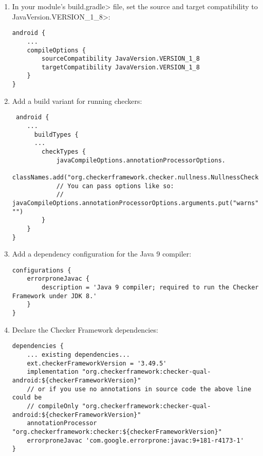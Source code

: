 \begin{enumerate}

\item In your module's \<build.gradle> file, set the source and target
  compatibility to \<JavaVersion.VERSION\_1\_8>:

\begin{Verbatim}
android {
    ...
    compileOptions {
        sourceCompatibility JavaVersion.VERSION_1_8
        targetCompatibility JavaVersion.VERSION_1_8
    }
}
\end{Verbatim}

\item Add a build variant for running checkers:

 \begin{Verbatim}
 android {
    ...
      buildTypes {
      ...
        checkTypes {
            javaCompileOptions.annotationProcessorOptions.
                    classNames.add("org.checkerframework.checker.nullness.NullnessChecker")
            // You can pass options like so:
            // javaCompileOptions.annotationProcessorOptions.arguments.put("warns", "")
        }
    }
}
\end{Verbatim}

\item Add a dependency configuration for the Java 9 compiler:

\begin{mysmall}
\begin{Verbatim}
configurations {
    errorproneJavac {
        description = 'Java 9 compiler; required to run the Checker Framework under JDK 8.'
    }
}

\end{Verbatim}
\end{mysmall}

\item Declare the Checker Framework dependencies:

\begin{mysmall}
\begin{Verbatim}
dependencies {
    ... existing dependencies...
    ext.checkerFrameworkVersion = '3.49.5'
    implementation "org.checkerframework:checker-qual-android:${checkerFrameworkVersion}"
    // or if you use no annotations in source code the above line could be
    // compileOnly "org.checkerframework:checker-qual-android:${checkerFrameworkVersion}"
    annotationProcessor "org.checkerframework:checker:${checkerFrameworkVersion}"
    errorproneJavac 'com.google.errorprone:javac:9+181-r4173-1'
}
\end{Verbatim}
\end{mysmall}


\end{enumerate}
